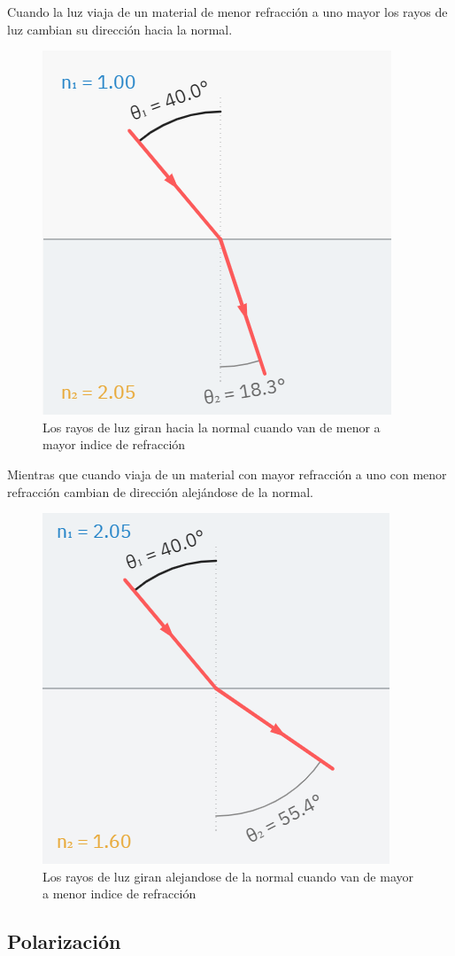 \documentclass{article}
\begin{document}
Cuando la luz viaja de un material de menor refracción a uno mayor los rayos de luz cambian su dirección hacia la normal.

\begin{figure}[H]
	\centering
	\includegraphics[width=0.5\linewidth]{Figuras/Less_More_Refraction}
	\caption{Los rayos de luz giran hacia la normal cuando van de menor a mayor indice de refracción}
	\label{fig:lessmorerefraction}
\end{figure}

Mientras que cuando viaja de un material con mayor refracción a uno con menor refracción cambian de dirección alejándose de la normal.

\begin{figure}[H]
	\centering
	\includegraphics[width=0.5\linewidth]{Figuras/More_Less_Refraction}
	\caption{Los rayos de luz giran alejandose de la normal cuando van de mayor a menor indice de refracción}
	\label{fig:morelessrefraction}
\end{figure}


\subsection{Polarización}
\end{document}
